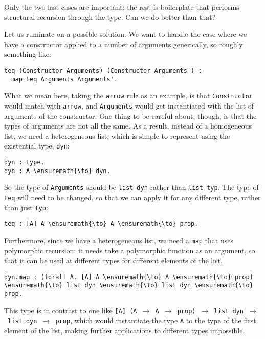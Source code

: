 Only the two last cases are important; the rest is boilerplate that
performs structural recursion through the type. Can we do better than
that?

Let us ruminate on a possible solution. We want to handle the case where
we have a constructor applied to a number of arguments generically, so
roughly something like:

\begin{verbatim}
teq (Constructor Arguments) (Constructor Arguments') :-
  map teq Arguments Arguments'.
\end{verbatim}

What we mean here, taking the \texttt{arrow} rule as an example, is that
\texttt{Constructor} would match with \texttt{arrow}, and
\texttt{Arguments} would get instantiated with the list of arguments of
the constructor. One thing to be careful about, though, is that the
types of arguments are not all the same. As a result, instead of a
homogeneous list, we need a heterogeneous list, which is simple to
represent using the existential type, \texttt{dyn}:

\begin{verbatim}
dyn : type.
dyn : A \ensuremath{\to} dyn.
\end{verbatim}

So the type of \texttt{Arguments} should be \texttt{list\ dyn} rather
than \texttt{list\ typ}. The type of \texttt{teq} will need to be
changed, so that we can apply it for any different type, rather than
just \texttt{typ}:

\begin{verbatim}
teq : [A] A \ensuremath{\to} A \ensuremath{\to} prop.
\end{verbatim}

Furthermore, since we have a heterogeneous list, we need a \texttt{map}
that uses polymorphic recursion: it needs take a polymorphic function as
an argument, so that it can be used at different types for different
elements of the list.

\begin{verbatim}
dyn.map : (forall A. [A] A \ensuremath{\to} A \ensuremath{\to} prop) \ensuremath{\to} list dyn \ensuremath{\to} list dyn \ensuremath{\to} prop.
\end{verbatim}

This type is in contrast to one like
\texttt{{[}A{]}\ (A\ \ensuremath{\to}\ A\ \ensuremath{\to}\ prop)\ \ensuremath{\to}\ list\ dyn\ \ensuremath{\to}\ list\ dyn\ \ensuremath{\to}\ prop},
which would instantiate the type \texttt{A} to the type of the first
element of the list, making further applications to different types
impossible.

